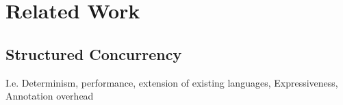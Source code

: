 \chapter{Related Work}
\section{Structured Concurrency}
I.e. Determinism, performance, extension of existing languages, Expressiveness, Annotation overhead
